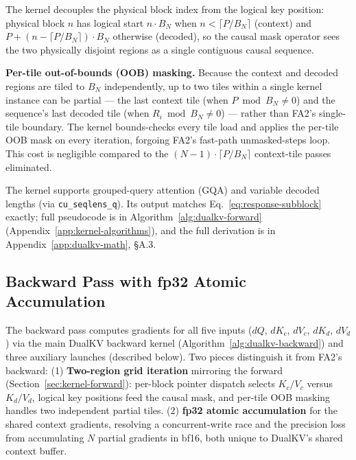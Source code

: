 \documentclass{article}
\begin{document}
The kernel decouples the physical block index from the logical key position: physical block $n$ has logical start $n \cdot B_N$ when $n < \lceil P / B_N \rceil$ (context) and $P + (n - \lceil P / B_N \rceil) \cdot B_N$ otherwise (decoded), so the causal mask operator sees the two physically disjoint regions as a single contiguous causal sequence.

\textbf{Per-tile out-of-bounds (OOB) masking.} Because the context and decoded regions are tiled to $B_N$ independently, up to two tiles within a single kernel instance can be partial --- the last context tile (when $P \bmod B_N \neq 0$) and the sequence's last decoded tile (when $R_i \bmod B_N \neq 0$) --- rather than FA2's single-tile boundary. The kernel bounds-checks every tile load and applies the per-tile OOB mask on every iteration, forgoing FA2's fast-path unmasked-steps loop. This cost is negligible compared to the $(N{-}1) \cdot \lceil P / B_N \rceil$ context-tile passes eliminated.

The kernel supports grouped-query attention (GQA) and variable decoded lengths (via \texttt{cu\_seqlens\_q}). Its output matches Eq.~\ref{eq:response-subblock} exactly; full pseudocode is in Algorithm~\ref{alg:dualkv-forward} (Appendix~\ref{app:kernel-algorithms}), and the full derivation is in Appendix~\ref{app:dualkv-math}, \S A.3.

\subsection{Backward Pass with fp32 Atomic Accumulation}
\label{sec:kernel-backward}

The backward pass computes gradients for all five inputs ($dQ$, $dK_c$, $dV_c$, $dK_d$, $dV_d$) via the main DualKV backward kernel (Algorithm~\ref{alg:dualkv-backward}) and three auxiliary launches (described below). Two pieces distinguish it from FA2's backward: (1) \textbf{Two-region grid iteration} mirroring the forward (Section~\ref{sec:kernel-forward}): per-block pointer dispatch selects $K_c/V_c$ versus $K_d/V_d$, logical key positions feed the causal mask, and per-tile OOB masking handles two independent partial tiles. (2) \textbf{fp32 atomic accumulation} for the shared context gradients, resolving a concurrent-write race and the precision loss from accumulating $N$ partial gradients in bf16, both unique to DualKV's shared context buffer.
\end{document}
